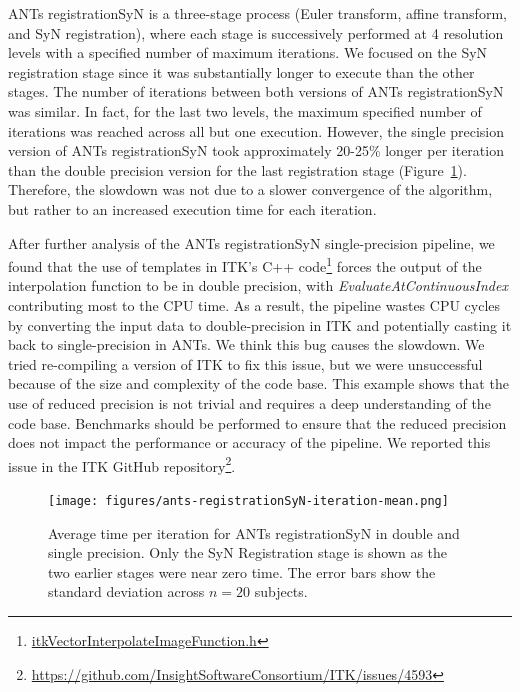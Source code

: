\documentclass[conference]{IEEEtran}
\begin{document}
ANTs registrationSyN is a three-stage process (Euler transform, affine transform, and SyN registration), where each stage is successively performed at 4 resolution levels with a specified number of maximum iterations. We focused on the SyN registration stage since it was substantially longer to execute than the other stages. The number of iterations between both versions of ANTs registrationSyN was similar. In fact, for the last two levels, the maximum specified number of iterations was reached across all but one execution. However, the single precision version of ANTs registrationSyN took approximately 20-25\% longer per iteration than the double precision version for the last registration stage (Figure~\ref{fig:mean-time-per-iteration-ants}). Therefore, the slowdown was not due to a slower convergence of the algorithm, but rather to an increased execution time for each iteration.

After further analysis of the ANTs registrationSyN single-precision pipeline, we found that the use of templates in ITK's C++ code\footnote{\href{https://github.com/InsightSoftwareConsortium/ITK/blob/d9c585d96359bf304ad3047148cee81bf27ac0c1/Modules/Core/ImageFunction/include/itkVectorInterpolateImageFunction.h\#L46-L48}{itkVectorInterpolateImageFunction.h}} forces the output of the interpolation function to be in double precision, with \textit{EvaluateAtContinuousIndex} contributing most to the CPU time. As a result, the pipeline wastes CPU cycles by converting the input data to double-precision in ITK and potentially casting it back to single-precision in ANTs. We think this bug causes the slowdown. We tried re-compiling a version of ITK to fix this issue, but we were unsuccessful because of the size and complexity of the code base. This example shows that the use of reduced precision is not trivial and requires a deep understanding of the code base. Benchmarks should be performed to ensure that the reduced precision does not impact the performance or accuracy of the pipeline. We reported this issue in the ITK GitHub repository\footnote{\href{https://github.com/InsightSoftwareConsortium/ITK/issues/4593}{https://github.com/InsightSoftwareConsortium/ITK/issues/4593}}.

\begin{figure}[ht]
	\texttt{[image: figures/ants-registrationSyN-iteration-mean.png]}
	\caption{Average time per iteration for ANTs registrationSyN in double and single precision. Only the SyN Registration stage is shown as the two earlier stages were near zero time. The error bars show the standard deviation across $n=20$ subjects.}
	\label{fig:mean-time-per-iteration-ants}
\end{figure}
						
\end{document}
